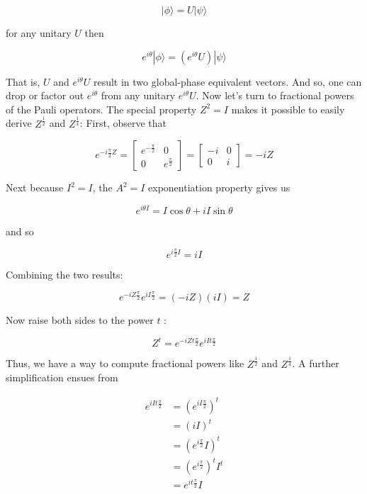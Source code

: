 \documentclass[main.tex]{subfiles}
\begin{document}
    $$
    |\phi\rangle=U|\psi\rangle
    $$
    
    for any unitary $U$ then
    
    $$
    e^{i \theta}|\phi\rangle=\left(e^{i \theta} U\right)|\psi\rangle
    $$
    
    That is, $U$ and $e^{i \theta} U$ result in two global-phase equivalent vectors. And so, one can drop or factor out $e^{i \theta}$ from any unitary $e^{i \theta} U$. Now let's turn to fractional powers of the Pauli operators. The special property $Z^{2}=I$ makes it possible to easily derive $Z^{\frac{1}{2}}$ and $Z^{\frac{1}{4}}$: First, observe that
    
    $$
    e^{-i \frac{\pi}{2} Z}=\left[\begin{array}{cc}
    e^{-\frac{\pi}{2}} & 0 \\
    0 & e^{\frac{\pi}{2}}
    \end{array}\right]=\left[\begin{array}{cc}
    -i & 0 \\
    0 & i
    \end{array}\right]=-i Z
    $$
    
    Next because $I^{2}=I$, the $A^{2}=I$ exponentiation property gives us
    
    $$
    e^{i \theta I}=I \cos \theta+i I \sin \theta
    $$
    
    and so
    
    $$
    e^{i \frac{\pi}{2} I}=i I
    $$
    
    Combining the two results:
    
    $$
    e^{-i Z \frac{\pi}{2}} e^{i I \frac{\pi}{2}}=(-i Z)(i I)=Z
    $$
    
    Now raise both sides to the power $t$ :
    
    $$
    Z^{t}=e^{-i Z t \frac{\pi}{2}} e^{i I t \frac{\pi}{2}}
    $$
    
    Thus, we have a way to compute fractional powers like $Z^{\frac{1}{2}}$ and $Z^{\frac{1}{4}}$. A further simplification ensues from
    
    $$
    \begin{aligned}
    e^{i I t \frac{\pi}{2}} &=\left(e^{i I \frac{\pi}{2}}\right)^{t} \\
    &=(i I)^{t} \\
    &=\left(e^{i \frac{\pi}{2}} I\right)^{t} \\
    &=\left(e^{i \frac{\pi}{2}}\right)^{t} I^{t} \\
    &=e^{i t \frac{\pi}{2}} I
    \end{aligned}
    $$
    
\end{document}
